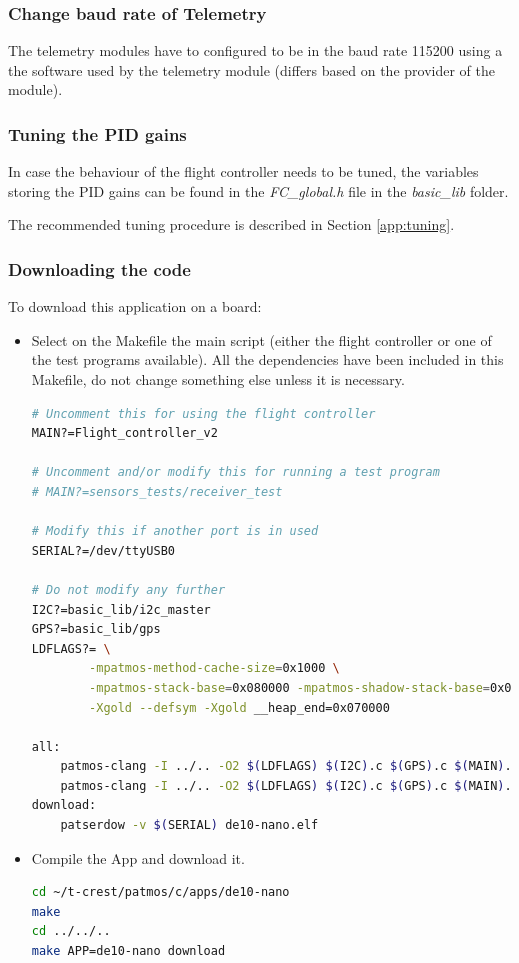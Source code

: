 \subsubsection*{Change baud rate of Telemetry}\label{telemetry_baud}
The telemetry modules have to configured to be in the baud rate 115200 using a the software used by the telemetry module \cite{bib:ardupilot} (differs based on the provider of the module). 


\subsubsection*{Tuning the PID gains}
In case the behaviour of the flight controller needs to be tuned, the variables storing the PID gains can be found in the \textit{FC\_global.h} file in the \textit{basic\_lib} folder.

The recommended tuning procedure is described in Section \ref{app:tuning}.

\subsubsection*{Downloading the code}


To download this application on a board:

\begin{itemize}
    \item Select on the Makefile the main script (either the flight controller or one of the test programs available). All the dependencies have been included in this Makefile, do not change something else unless it is necessary.
    
    \lstset{style=Bstyle}
    \begin{lstlisting}[language=bash]
# Uncomment this for using the flight controller
MAIN?=Flight_controller_v2

# Uncomment and/or modify this for running a test program
# MAIN?=sensors_tests/receiver_test

# Modify this if another port is in used
SERIAL?=/dev/ttyUSB0

# Do not modify any further
I2C?=basic_lib/i2c_master
GPS?=basic_lib/gps
LDFLAGS?= \
        -mpatmos-method-cache-size=0x1000 \
        -mpatmos-stack-base=0x080000 -mpatmos-shadow-stack-base=0x078000 \
        -Xgold --defsym -Xgold __heap_end=0x070000

all:
	patmos-clang -I ../.. -O2 $(LDFLAGS) $(I2C).c $(GPS).c $(MAIN).c -o de10-nano.elf -lm
	patmos-clang -I ../.. -O2 $(LDFLAGS) $(I2C).c $(GPS).c $(MAIN).c -o ~/t-crest/patmos/tmp/de10-nano.elf -lm
download:
	patserdow -v $(SERIAL) de10-nano.elf
    \end{lstlisting} 
    
    
    \item Compile the App and download it.
    
\lstset{style=Bstyle}
\begin{lstlisting}[language=bash]
cd ~/t-crest/patmos/c/apps/de10-nano
make
cd ../../..
make APP=de10-nano download
\end{lstlisting} 

\end{itemize} 



